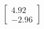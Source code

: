 \documentclass[preview]{standalone}
\begin{document}
\begin{align*}
\begin{bmatrix} 4.92 \\ -2.96 \end{bmatrix}
\end{align*}
\end{document}
